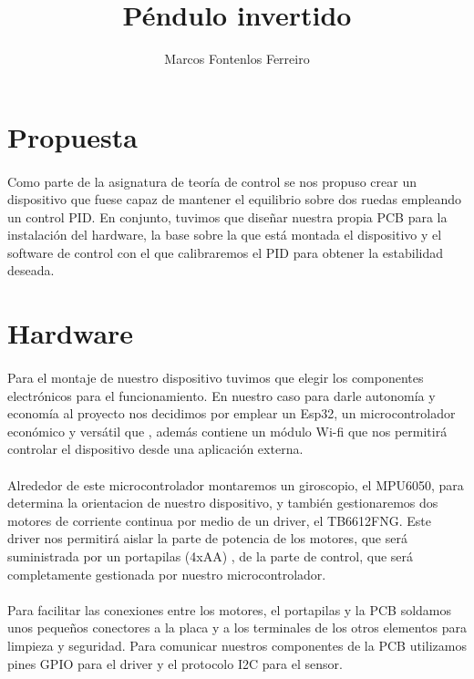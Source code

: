 \documentclass[]{article}
\title{Péndulo invertido}
\author{Marcos Fontenlos Ferreiro}
\begin{document}
 
\maketitle

\section{Propuesta}
\paragraph{}
Como parte de la asignatura de teoría de control se nos propuso crear un dispositivo que fuese capaz de mantener el equilibrio sobre dos ruedas empleando un control PID. En conjunto, tuvimos que diseñar nuestra propia PCB para la instalación del hardware, la base sobre la que está montada el dispositivo y el software de control con el que calibraremos el PID para obtener la estabilidad deseada.

\section{Hardware}
\paragraph{}
Para el montaje de nuestro dispositivo tuvimos que elegir los componentes electrónicos para el funcionamiento. En nuestro caso para darle autonomía y economía al proyecto nos decidimos por emplear un Esp32, un microcontrolador económico y versátil que , además contiene un módulo Wi-fi que nos permitirá controlar el dispositivo desde una aplicación externa. 

\paragraph{}
Alrededor de este microcontrolador montaremos un giroscopio, el MPU6050, para determina la orientacion de nuestro dispositivo, y también gestionaremos dos motores de corriente continua por medio de un driver, el TB6612FNG. Este driver nos permitirá aislar la parte de potencia de los motores, que será suministrada por un portapilas (4xAA)
, de la parte de control, que será completamente gestionada por nuestro microcontrolador.
\paragraph{}
Para facilitar las conexiones entre los motores, el portapilas y la PCB soldamos unos pequeños conectores a la placa y a los terminales de los otros elementos para limpieza y seguridad. Para comunicar nuestros componentes de la PCB utilizamos pines GPIO para el driver y el protocolo I2C para el sensor.
\end{document}
